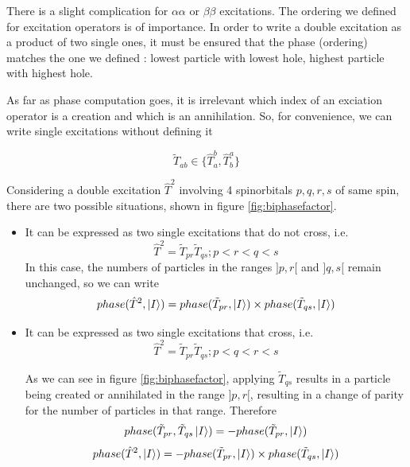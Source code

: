 \documentclass[./thesis.tex]{subfiles}
\begin{document}
There is a slight complication for $\alpha \alpha$ or $\beta \beta$ excitations. The ordering we defined for excitation operators is of importance. In order to write a double excitation as a product of two single ones, it must be ensured that the phase (ordering) matches the one we defined : lowest particle with lowest hole, highest particle with highest hole.

As far as phase computation goes, it is irrelevant which index of an exciation operator is a creation and which is an annihilation. So, for convenience, we can write single excitations without defining it

\begin{equation}
\tilde T_{ab} \in \{\hat T_a^b, \hat T_b^a \}
\end{equation}




Considering a double excitation $\hat T^2$ involving 4 spinorbitals $p,q,r,s$ of same spin, there are two possible situations, shown in figure \ref{fig:biphasefactor}. 




\begin{itemize}
\item
It can be expressed as two single excitations that do not cross, i.e.
\begin{equation}
\hat T^2=\tilde T_{pr} \tilde T_{qs};p<r<q<s
\end{equation}
In this case, the numbers of particles in the ranges $]p, r[$ and $]q, s[$ remain unchanged, so we can write
\begin{equation}
phase(\hat T^2, \ket I) = phase(\tilde T_{pr}, \ket I) \times phase(\tilde T_{qs}, \ket I) 
\end{equation}

\item
It can be expressed as two single excitations that cross, i.e.
\begin{equation}
\hat T^2=\tilde T_{pr} \tilde T_{qs};p<q<r<s
\end{equation}


As we can see in figure \ref{fig:biphasefactor}, applying  $\tilde T_{qs}$ results in a particle being created or annihilated in the range $]p,r[$, resulting in a change of parity for the number of particles in that range. Therefore
\begin{equation}
phase(\tilde T_{pr}, \tilde T_{qs} \ket I) = -phase(\tilde T_{pr}, \ket I)
\end{equation}
\begin{equation}
phase(\hat T^2, \ket I) = -phase(\tilde T_{pr}, \ket I) \times phase(\tilde T_{ qs}, \ket I) 
\end{equation}

\end{itemize}
\end{document}
